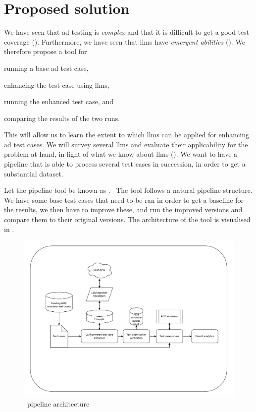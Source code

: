 \chapter{Proposed solution}\label{sec:solutionProposal}

We have seen that \acrshort{ad} testing is \textit{complex} and that it is difficult to get a good
test coverage (). Furthermore, we have seen that \acrshort{llms} have
\textit{emergent abilities} (). We therefore propose a tool for
\begin{inparaenum}
    \item running a base \acrshort{ad} test case,
    \item enhancing the test case using \acrshort{llms},
    \item running the enhanced test case,
    and
    \item comparing the results of the two runs.
\end{inparaenum}

This will allow us to learn the extent to which \acrshort{llms} can be applied for enhancing
\acrlong{ad} test cases. We will survey several \acrshort{llms} and evaluate their applicability for
the problem at hand, in light of what we know about \acrshort{llms} ().
We want to have a pipeline that is able to process several test cases in succession, in order to get
a substantial dataset.

Let the pipeline tool be known as \hefe.~%
The tool follows a natural pipeline structure. We have some base test cases that
need to be ran in order to get a baseline for the results, we then have to
improve these, and run the improved versions and compare them to their original
versions. The architecture of the tool is visualised in .

\begin{figure}[h]
    \centering
    \includegraphics[width=\textwidth]{figures/Inkscape/master-essay-solution-proposal.drawio.pdf}
    \caption{\hefe~pipeline architecture}\label{fig:hefeArch}
\end{figure}

